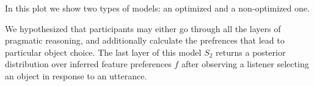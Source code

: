 \documentclass[10pt,a4paper]{article}
\begin{document}
In this plot we show two types of models: an optimized and a non-optimized one.


We hypothesized that participants may either go through all the layers of pragmatic reasoning, and additionally calculate the prefrences that lead to particular object choice. The last layer of this model $S_2$  returns a posterior distribution over inferred feature preferences $f$ after observing a listener selecting an object in response to an utterance. 
\end{document}
